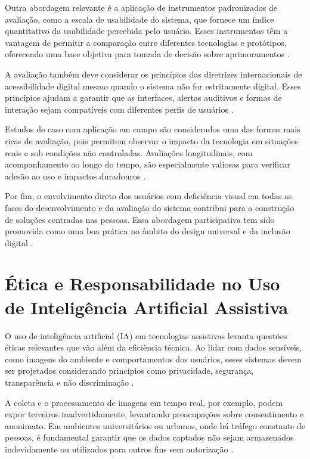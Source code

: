 Outra abordagem relevante é a aplicação de instrumentos padronizados de avaliação, como a escala de usabilidade do sistema, que fornece um índice quantitativo da usabilidade percebida pelo usuário. Esses instrumentos têm a vantagem de permitir a comparação entre diferentes tecnologias e protótipos, oferecendo uma base objetiva para tomada de decisão sobre aprimoramentos \cite{Brooke1996}.

A avaliação também deve considerar os princípios das diretrizes internacionais de acessibilidade digital mesmo quando o sistema não for estritamente digital. Esses princípios ajudam a garantir que as interfaces, alertas auditivos e formas de interação sejam compatíveis com diferentes perfis de usuários \cite{W3C2023}.

Estudos de caso com aplicação em campo são considerados uma das formas mais ricas de avaliação, pois permitem observar o impacto da tecnologia em situações reais e sob condições não controladas. Avaliações longitudinais, com acompanhamento ao longo do tempo, são especialmente valiosas para verificar adesão ao uso e impactos duradouros \cite{Batavia1990}.

Por fim, o envolvimento direto dos usuários com deficiência visual em todas as fases do desenvolvimento e da avaliação do sistema contribui para a construção de soluções centradas nas pessoas. Essa abordagem participativa tem sido promovida como uma boa prática no âmbito do design universal e da inclusão digital \cite{Story1998}.

\section{\textbf{Ética e Responsabilidade no Uso de Inteligência Artificial Assistiva}}

O uso de inteligência artificial (IA) em tecnologias assistivas levanta questões éticas relevantes que vão além da eficiência técnica. Ao lidar com dados sensíveis, como imagens do ambiente e comportamentos dos usuários, esses sistemas devem ser projetados considerando princípios como privacidade, segurança, transparência e não discriminação \cite{Floridi2018}.

A coleta e o processamento de imagens em tempo real, por exemplo, podem expor terceiros inadvertidamente, levantando preocupações sobre consentimento e anonimato. Em ambientes universitários ou urbanos, onde há tráfego constante de pessoas, é fundamental garantir que os dados captados não sejam armazenados indevidamente ou utilizados para outros fins sem autorização \cite{Jobin2019}.

